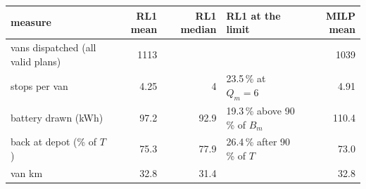 \begin{tabular}{@{}lrrlr@{}}
\toprule
measure & RL1 mean & RL1 median & RL1 at the limit & MILP mean \\
\midrule
vans dispatched (all valid plans) & 1113 &  &  & 1039 \\
stops per van & 4.25 & 4 & 23.5\,\% at $Q_m=6$ & 4.91 \\
battery drawn (kWh) & 97.2 & 92.9 & 19.3\,\% above 90\,\% of $B_m$ & 110.4 \\
back at depot (\% of $T$) & 75.3 & 77.9 & 26.4\,\% after 90\,\% of $T$ & 73.0 \\
van km & 32.8 & 31.4 &  & 32.8 \\
\bottomrule
\end{tabular}
